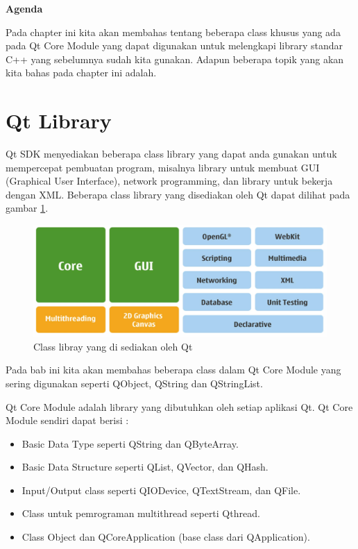 \textbf{Agenda}

Pada chapter ini kita akan membahas tentang beberapa class khusus yang
ada pada Qt Core Module yang dapat digunakan untuk melengkapi library
standar C++ yang sebelumnya sudah kita gunakan. Adapun beberapa topik
yang akan kita bahas pada chapter ini adalah.

\minitoc

\section{Qt Library}\label{qt-library-1}

Qt SDK menyediakan beberapa class library yang dapat anda gunakan untuk
mempercepat pembuatan program, misalnya library untuk membuat GUI
(Graphical User Interface), network programming, dan library untuk
bekerja dengan XML. Beberapa class library yang disediakan oleh Qt dapat
dilihat pada gambar \ref{fig:qt-library}.

\begin{figure}[htbp]
\centering
\includegraphics[width=0.9\linewidth]{../manuscript/images/qt-library}
\caption{Class libray yang di sediakan oleh Qt}
\label{fig:qt-library}
\end{figure}


Pada bab ini kita akan membahas beberapa class dalam Qt Core Module
yang sering digunakan seperti QObject, QString 
dan QStringList.

Qt Core Module adalah library yang dibutuhkan oleh setiap aplikasi Qt.
Qt Core Module sendiri dapat berisi :

\begin{itemize}

\item
  Basic Data Type seperti QString dan QByteArray.
\item
  Basic Data Structure seperti QList, QVector, dan QHash.
\item
  Input/Output class seperti QIODevice, QTextStream, dan QFile.
\item
  Class untuk pemrograman multithread seperti Qthread.
\item
  Class Object dan QCoreApplication (base class dari QApplication).
\end{itemize}

